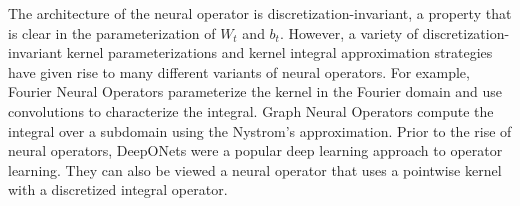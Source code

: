 \documentclass[12pt]{article}
\begin{document}

The architecture of the neural operator is discretization-invariant, a property that is clear in the parameterization of $W_t$ and $b_t$. However, a variety of discretization-invariant kernel parameterizations and kernel integral approximation strategies have given rise to many different variants of neural operators.  
For example, Fourier Neural Operators \autocite{li2020fourier} parameterize the kernel in the Fourier domain and use convolutions to characterize the integral. Graph Neural Operators \autocite{li2020multipole} compute the integral over a subdomain using the Nystrom's approximation. Prior to the rise of neural operators, DeepONets \autocite{lu2021learning} were a popular deep learning approach to operator learning. They can also be viewed a neural operator that uses a pointwise kernel with a discretized integral operator. 

\end{document}
